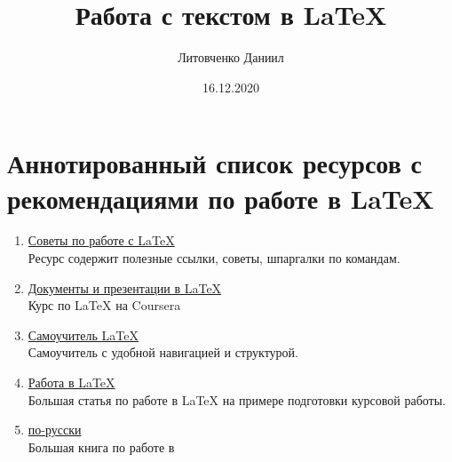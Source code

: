 \documentclass[a4paper,12pt]{article} %
\author{Литовченко Даниил}
\title{Работа с текстом в \LaTeX{}}
\date{16.12.2020}
\begin{document}

\maketitle
\newpage
\section{Аннотированный список ресурсов с рекомендациями по работе в \LaTeX}
\begin{enumerate}
\item \href{https://sites.google.com/view/brainleaks/советы-по-работе-с-latex}{Советы по работе с \LaTeX{}}\\
Ресурс содержит полезные ссылки, советы, шпаргалки по командам.
\item \href{https://www.coursera.org/lecture/latex/kak-rabotaiet-latex-lAJai}{Документы и презентации в LaTeX}\\
Курс по \LaTeX{} на Coursera 
\item \href{https://www.andreyolegovich.ru/PC/LaTeX.php}{Самоучитель \LaTeX{}}\\
Самоучитель с удобной навигацией и структурой.
\item \href{https://www.ibm.com/developerworks/ru/library/latex_tutorial_01/}{Работа в LaTeX}\\
Большая статья по работе в \LaTeX{} на примере подготовки курсовой работы.
\item \href{https://astronu.jinr.ru/wiki/images/b/bf/KotelnikovChebotaev.pdf}{\LaTeXe по-русски}\\
Большая книга по работе в \LaTeXe
\end{enumerate}
\end{document}
